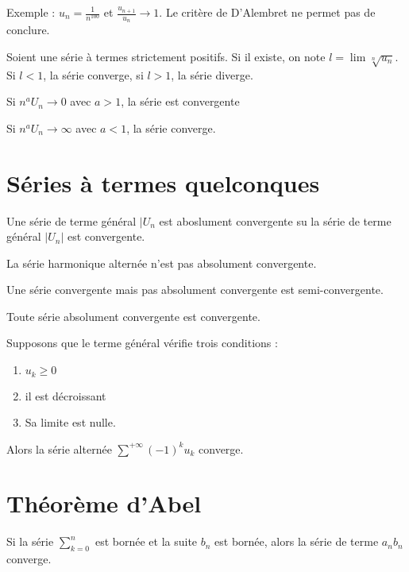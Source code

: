 \documentclass[french]{yLectureNote}
\begin{document}
Exemple : $u_n = \frac{1}{n^{100}}$ et $\frac{u_{n+1}}{u_n}\to 1$. Le critère de D'Alembret ne permet pas de conclure.

\begin{theorem}
 Soient une série à termes strictement positifs. Si il existe, on note \(l = \lim \sqrt[n]{u_n}\). Si \(l<1\), la série converge, si \(l>1\), la série diverge.
\end{theorem}
\begin{theorem}
Si \(n^a U_n \to 0\) avec \(a>1\), la série est convergente

Si \(n^a U_n \to \infty\) avec \(a<1\), la série converge.
\end{theorem}
\section{Séries à termes quelconques}
\begin{definition}
Une série de terme général \(|U_n\) est aboslument convergente su la série de terme général \(|U_n|\) est convergente.
\end{definition}
La série harmonique alternée n'est pas absolument convergente.
\begin{definition}
Une série convergente mais pas absolument convergente est semi-convergente.
\end{definition}
\begin{theorem}[]
 Toute série absolument convergente est convergente.
\end{theorem}
\begin{myproof}

\end{myproof}
\begin{theorem}
 Supposons que le terme général vérifie trois conditions :
 \begin{enumerate}
  \item \(u_k \geq 0\)
  \item il est décroissant
  \item Sa limite est nulle.
 \end{enumerate}
Alors la série alternée \(\sum^{+\infty}(-1)^k u_k\) converge.
\end{theorem}
\section{Théorème d'Abel}
\begin{theorem}
 Si la série \(\sum_{k=0}^n\) est bornée et la suite \(b_n\) est bornée, alors la série de terme \(a_n b_n\) converge.

\end{theorem}
\end{document}
